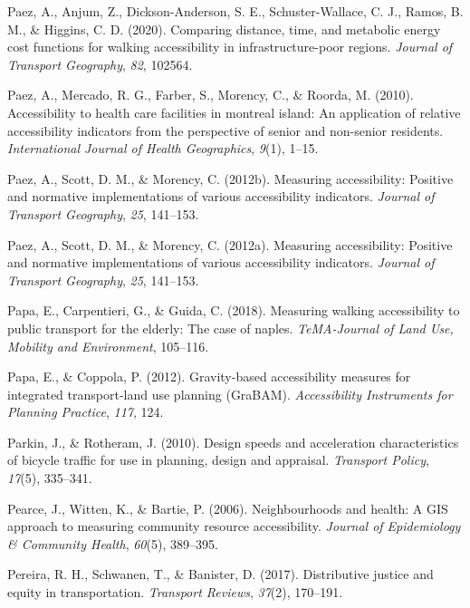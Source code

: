 \documentclass[
11pt, %
oneside, %
english, %
singlespacing, %
]{macthesis} %
\newlength{\cslhangindent}
\newenvironment{CSLReferences}[2] %
{\begin{list}{}{%
	\setlength{\itemindent}{0pt}
	\setlength{\leftmargin}{0pt}
	\setlength{\parsep}{0pt}
	\ifodd #1
	\setlength{\leftmargin}{\cslhangindent}
	\setlength{\itemindent}{-1\cslhangindent}
	\fi
	\setlength{\itemsep}{#2\baselineskip}}}
{\end{list}}
\begin{document}
\begin{CSLReferences}{1}{0}
Paez, A., Anjum, Z., Dickson-Anderson, S. E., Schuster-Wallace, C. J., Ramos, B. M., \& Higgins, C. D. (2020). Comparing distance, time, and metabolic energy cost functions for walking accessibility in infrastructure-poor regions. \emph{Journal of Transport Geography}, \emph{82}, 102564.

Paez, A., Mercado, R. G., Farber, S., Morency, C., \& Roorda, M. (2010). Accessibility to health care facilities in montreal island: An application of relative accessibility indicators from the perspective of senior and non-senior residents. \emph{International Journal of Health Geographics}, \emph{9}(1), 1--15.

Paez, A., Scott, D. M., \& Morency, C. (2012b). Measuring accessibility: Positive and normative implementations of various accessibility indicators. \emph{Journal of Transport Geography}, \emph{25}, 141--153.

Paez, A., Scott, D. M., \& Morency, C. (2012a). Measuring accessibility: Positive and normative implementations of various accessibility indicators. \emph{Journal of Transport Geography}, \emph{25}, 141--153.

Papa, E., Carpentieri, G., \& Guida, C. (2018). Measuring walking accessibility to public transport for the elderly: The case of naples. \emph{TeMA-Journal of Land Use, Mobility and Environment}, 105--116.

Papa, E., \& Coppola, P. (2012). Gravity-based accessibility measures for integrated transport-land use planning (GraBAM). \emph{Accessibility Instruments for Planning Practice}, \emph{117}, 124.

Parkin, J., \& Rotheram, J. (2010). Design speeds and acceleration characteristics of bicycle traffic for use in planning, design and appraisal. \emph{Transport Policy}, \emph{17}(5), 335--341.

Pearce, J., Witten, K., \& Bartie, P. (2006). Neighbourhoods and health: A GIS approach to measuring community resource accessibility. \emph{Journal of Epidemiology \& Community Health}, \emph{60}(5), 389--395.

Pereira, R. H., Schwanen, T., \& Banister, D. (2017). Distributive justice and equity in transportation. \emph{Transport Reviews}, \emph{37}(2), 170--191.


\end{CSLReferences}
\end{document}

